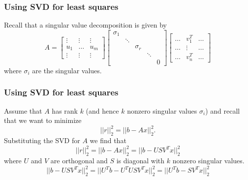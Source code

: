 \documentclass[10pt]{beamer}
\begin{document}
\begin{frame}
\frametitle{Using SVD for least squares}
Recall that a singular value decomposition is given by 
\[
A =
\begin{bmatrix}
    \vdots & \vdots & \vdots\\
    u_1    & \dots  & u_m \\
    \vdots & \vdots & \vdots
\end{bmatrix}
\begin{bmatrix}
    \sigma_1 &        &          &        &\\
             & \ddots &          &        & \\
             &        & \sigma_r &        & \\
             &        &          & \ddots & \\
             &        &          &        & 0 
\end{bmatrix}
\begin{bmatrix}
    \dots & v_1^T & \dots\\
    \dots & \vdots & \dots\\
    \dots & v_n^T & \dots
\end{bmatrix}
\] where $\sigma_i$ are the singular values.  
\end{frame}
\begin{frame}
\frametitle{Using SVD for least squares}
Assume that $A$ has rank $k$ (and hence $k$ nonzero singular values $\sigma_i$) and recall that we want to minimize $$||r||^2_2 = ||b-Ax||^2_2.$$  Substituting the SVD for $A$ we find that $$||r||^2_2 = ||b-Ax||^2_2 = ||b-USV^Tx||^2_2$$  where $U$ and $V$ are orthogonal and $S$ is diagonal with $k$ nonzero singular values.  $$||b-USV^Tx||^2_2 = ||U^Tb-U^TUSV^Tx||^2_2 = ||U^Tb-SV^Tx||^2_2$$ 

\end{frame}
\end{document}
